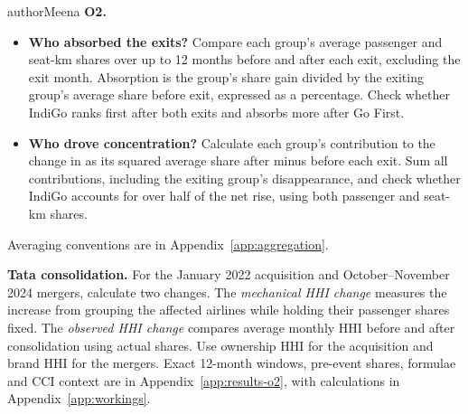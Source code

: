 \begin{authorcontribution}{authorMeena}
\label{sec:method-o2}
\textbf{O2.}
\begin{itemize}[leftmargin=2em]
	\item \textbf{Who absorbed the exits?} Compare each group's average passenger and seat-km shares over up to 12 months before and after each exit, excluding the exit month. Absorption is the group's share gain divided by the exiting group's average share before exit, expressed as a percentage. Check whether IndiGo ranks first after both exits and absorbs more after Go First.
	\item \textbf{Who drove concentration?} Calculate each group's contribution to the change in \HHI{} as its squared average share after minus before each exit. Sum all contributions, including the exiting group's disappearance, and check whether IndiGo accounts for over half of the net rise, using both passenger and seat-km shares.
\end{itemize}
Averaging conventions are in Appendix~\ref{app:aggregation}.

\textbf{Tata consolidation.} For the January 2022 acquisition and October--November 2024 mergers, calculate two changes. The \emph{mechanical HHI change} measures the increase from grouping the affected airlines while holding their passenger shares fixed. The \emph{observed HHI change} compares average monthly HHI before and after consolidation using actual shares. Use ownership HHI for the acquisition and brand HHI for the mergers. Exact 12-month windows, pre-event shares, formulae and CCI context \parencite{cci2023vistara} are in Appendix~\ref{app:results-o2}, with calculations in Appendix~\ref{app:workings}.
\end{authorcontribution}
